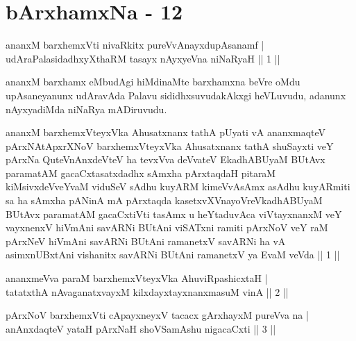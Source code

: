 \chapter{bArxhamxNa - 12}


\begin{shl}
ananxM barxhemxVti nivaRkitx pureVvAnayxdupAsanamf | \\
udAraPalasidadhxyXthaRM tasayx nAyxyeVna niNaRyaH \hfill ||  1 || 
\end{shl}

\begin{artha}
ananxM barxhamx eMbudAgi hiMdinaMte barxhamxna beVre oMdu upAsaneyanunx udAravAda Palavu sididhxsuvudakAkxgi heVLuvudu, adanunx nAyxyadiMda niNaRya mADiruvudu.
\end{artha}

\begin{kandikeshl}
ananxM barxhemxVteyxVka Ahusatxnanx tathA pUyati vA ananxmaqteV pArxNAtApxrXNoV barxhemxVteyxVka Ahusatxnanx tathA shuSayxti veY pArxNa QuteV\s nAnxdeVteV ha tevxVva deVvateV EkadhABUyaM BUtAvx paramatAM gacaCxtasatxdadhx sAmxha pArxtaqdaH pitaraM kiMsivxdeVveYvaM viduSeV sAdhu kuyARM kimeVvAsAmx asAdhu kuyARmiti sa ha sAmxha pANinA mA pArxtaqda kasetxvXVnayoVreVkadhABUyaM BUtAvx paramatAM gacaCxtiVti tasAmx u heYtaduvAca viVtayxnanxM veY vayxnenxV hiVmAni savARNi BUtAni viSATxni ramiti pArxNoV veY raM pArxNeV hiVmAni savARNi BUtAni ramanetxV savARNi ha vA asimxnUBxtAni vishanitx savARNi BUtAni ramanetxV ya EvaM veVda || 1 ||
\end{kandikeshl}


\begin{shl}
ananxmeVva paraM barxhemxVteyxVka AhuviRpashicxtaH | \\
tatatxthA nAvaganatxvayxM kilxdayxtayxnanxmasuM vinA \hfill ||  2 ||
\end{shl}

\begin{shl}
pArxNoV barxhemxVti cApayxneyxV tacacx gArxhayxM pureVva na | \\
anAnxdaqteV yataH pArxNaH shoVSamAshu nigacaCxti \hfill ||  3 || 
\end{shl}

